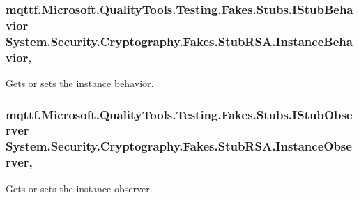\hypertarget{class_system_1_1_security_1_1_cryptography_1_1_fakes_1_1_stub_r_s_a_ae9aa2c17852dddb8585a8d975c840104}{
\subsubsection[{Instance\-Behavior}]{\setlength{\rightskip}{0pt plus 5cm}mqttf.\-Microsoft.\-Quality\-Tools.\-Testing.\-Fakes.\-Stubs.\-I\-Stub\-Behavior System.\-Security.\-Cryptography.\-Fakes.\-Stub\-R\-S\-A.\-Instance\-Behavior\hspace{0.3cm}{\ttfamily [get]}, {\ttfamily [set]}}}\label{class_system_1_1_security_1_1_cryptography_1_1_fakes_1_1_stub_r_s_a_ae9aa2c17852dddb8585a8d975c840104}


Gets or sets the instance behavior.

\hypertarget{class_system_1_1_security_1_1_cryptography_1_1_fakes_1_1_stub_r_s_a_aade4fccba0046910042b3ab8128db5ee}{
\subsubsection[{Instance\-Observer}]{\setlength{\rightskip}{0pt plus 5cm}mqttf.\-Microsoft.\-Quality\-Tools.\-Testing.\-Fakes.\-Stubs.\-I\-Stub\-Observer System.\-Security.\-Cryptography.\-Fakes.\-Stub\-R\-S\-A.\-Instance\-Observer\hspace{0.3cm}{\ttfamily [get]}, {\ttfamily [set]}}}\label{class_system_1_1_security_1_1_cryptography_1_1_fakes_1_1_stub_r_s_a_aade4fccba0046910042b3ab8128db5ee}


Gets or sets the instance observer.

